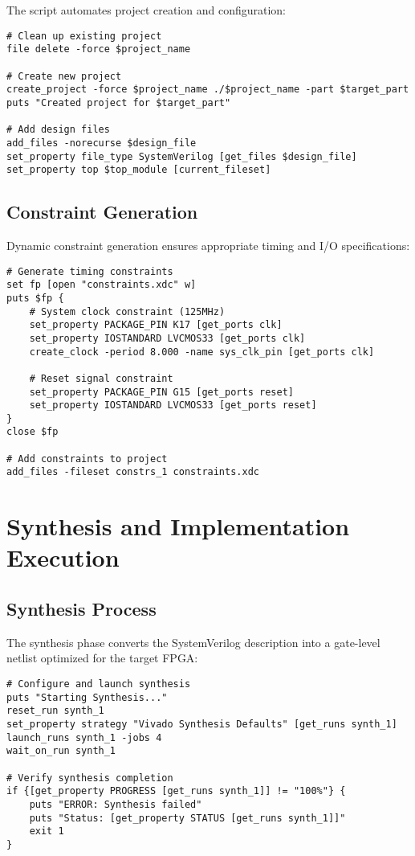 The script automates project creation and configuration:

\begin{lstlisting}[caption=Automated Project Setup]
# Clean up existing project
file delete -force $project_name

# Create new project
create_project -force $project_name ./$project_name -part $target_part
puts "Created project for $target_part"

# Add design files
add_files -norecurse $design_file
set_property file_type SystemVerilog [get_files $design_file]
set_property top $top_module [current_fileset]
\end{lstlisting}

\subsection{Constraint Generation}

Dynamic constraint generation ensures appropriate timing and I/O specifications:

\begin{lstlisting}[caption=Constraint File Generation]
# Generate timing constraints
set fp [open "constraints.xdc" w]
puts $fp {
    # System clock constraint (125MHz)
    set_property PACKAGE_PIN K17 [get_ports clk]
    set_property IOSTANDARD LVCMOS33 [get_ports clk]
    create_clock -period 8.000 -name sys_clk_pin [get_ports clk]
    
    # Reset signal constraint
    set_property PACKAGE_PIN G15 [get_ports reset]
    set_property IOSTANDARD LVCMOS33 [get_ports reset]
}
close $fp

# Add constraints to project
add_files -fileset constrs_1 constraints.xdc
\end{lstlisting}

\section{Synthesis and Implementation Execution}
\label{sec:synthesis_implementation}

\subsection{Synthesis Process}

The synthesis phase converts the SystemVerilog description into a gate-level netlist optimized for the target FPGA:

\begin{lstlisting}[caption=Synthesis Execution]
# Configure and launch synthesis
puts "Starting Synthesis..."
reset_run synth_1
set_property strategy "Vivado Synthesis Defaults" [get_runs synth_1]
launch_runs synth_1 -jobs 4
wait_on_run synth_1

# Verify synthesis completion
if {[get_property PROGRESS [get_runs synth_1]] != "100%"} {
    puts "ERROR: Synthesis failed"
    puts "Status: [get_property STATUS [get_runs synth_1]]"
    exit 1
}
\end{lstlisting}


